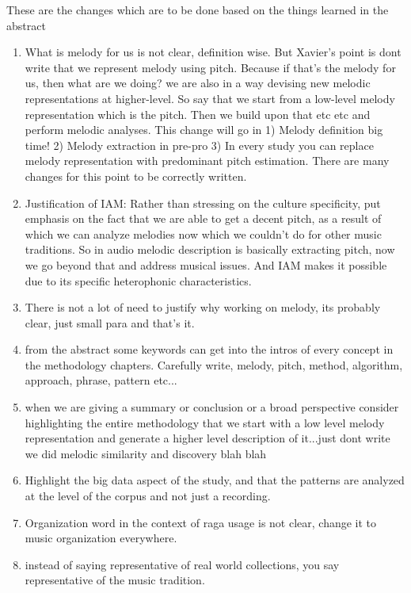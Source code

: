 These are the changes which are to be done based on the things learned in the abstract

\begin{enumerate}
	\item What is melody for us is not clear, definition wise. But Xavier's point is dont write that we represent melody using pitch. Because if that's the melody for us, then what are we doing? we are also in a way devising new melodic representations at higher-level. So say that we start from a low-level melody representation which is the pitch. Then we build upon that etc etc and perform melodic analyses. This change will go in 1) Melody definition big time! 2) Melody extraction in pre-pro 3) In every study you can replace melody representation with predominant pitch estimation. There are many changes for this point to be correctly written. 
	
	\item Justification of IAM: Rather than stressing on the culture specificity, put emphasis on the fact that we are able to get a decent pitch, as a result of which we can analyze melodies now which we couldn't do for other music traditions. So in audio melodic description is basically extracting pitch, now we go beyond that and address musical issues. And IAM makes it possible due to its specific heterophonic characteristics. 
	
	\item There is not a lot of need to justify why working on melody, its probably clear, just small para and that's it. 
	
	\item from the abstract some keywords can get into the intros of every concept in the methodology chapters. Carefully write, melody, pitch, method, algorithm, approach, phrase, pattern etc...
	
	\item when we are giving a summary or conclusion or a broad perspective consider highlighting the entire methodology that we start with a low level melody representation and generate a higher level description of it...just dont write we did melodic similarity and discovery blah blah
	
	\item Highlight the big data aspect of the study, and that the patterns are analyzed at the level of the corpus and not just a recording. 
	
	\item Organization word in the context of raga usage is not clear, change it to music organization everywhere.
	
	\item instead of saying representative of real world collections, you say representative of the music tradition. 
	
\end{enumerate}

